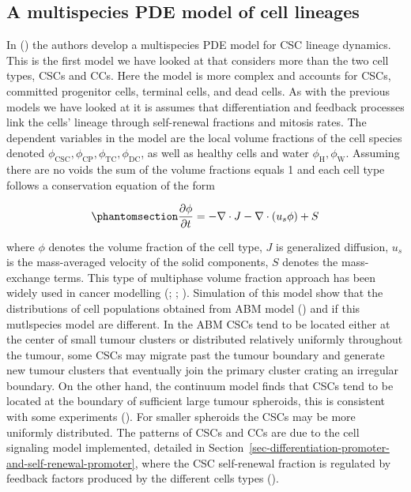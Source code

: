 \documentclass[
  letterpaper,
]{scrreprt}
\theoremstyle{definition}
\theoremstyle{remark}
\begin{document}
\subsection{A multispecies PDE model of cell
lineages}\label{sec-multispecies-model-of-cell-lineages}

In () the authors
develop a multispecies PDE model for CSC lineage dynamics. This is the
first model we have looked at that considers more than the two cell
types, CSCs and CCs. Here the model is more complex and accounts for
CSCs, committed progenitor cells, terminal cells, and dead cells. As
with the previous models we have looked at it is assumes that
differentiation and feedback processes link the cells' lineage through
self-renewal fractions and mitosis rates. The dependent variables in the
model are the local volume fractions of the cell species denoted
\(\phi_\text{CSC}, \phi_\text{CP}, \phi_\text{TC}, \phi_\text{DC}\), as
well as healthy cells and water \(\phi_\text{H}, \phi_\text{W}\).
Assuming there are no voids the sum of the volume fractions equals 1 and
each cell type follows a conservation equation of the form

\begin{equation}\phantomsection\label{eq-youssefpour-multispecies}{
\frac{\partial \phi}{\partial t} = - \nabla \cdot J - \nabla \cdot (u_s \phi) + S
}\end{equation}

where \(\phi\) denotes the volume fraction of the cell type, \(J\) is
generalized diffusion, \(u_s\) is the mass-averaged velocity of the
solid components, \(S\) denotes the mass-exchange terms. This type of
multiphase volume fraction approach has been widely used in cancer
modelling (;
;
). Simulation of this
model show that the distributions of cell populations obtained from ABM
model () and if this
mutlspecies model are different. In the ABM CSCs tend to be located
either at the center of small tumour clusters or distributed relatively
uniformly throughout the tumour, some CSCs may migrate past the tumour
boundary and generate new tumour clusters that eventually join the
primary cluster crating an irregular boundary. On the other hand, the
continuum model finds that CSCs tend to be located at the boundary of
sufficient large tumour spheroids, this is consistent with some
experiments (). For smaller
spheroids the CSCs may be more uniformly distributed. The patterns of
CSCs and CCs are due to the cell signaling model implemented, detailed
in Section~\ref{sec-differentiation-promoter-and-self-renewal-promoter},
where the CSC self-renewal fraction is regulated by feedback factors
produced by the different cells types
().
\end{document}

